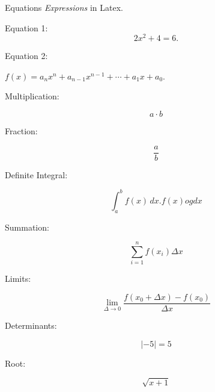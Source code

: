 \documentclass[a4paper,12pt,oneside,article]{memoir}
\begin{document}
\begin{flushleft}
Equations \emph{Expressions} in Latex.

Equation 1:
\begin{equation}
	2x^2+4=6.\label{eq:ligning}
\end{equation}

Equation 2: 
\begin{flushright}
    $f(x) = a_{n} x^{n} + a_{n-1}x^{n-1}+\cdots +a_{1}x + a_{0}$.
\end{flushright}


Multiplication:

\begin{equation*}
	a\cdot b
\end{equation*}

\vspace{.005cm}

Fraction:


\begin{equation*}
	\frac{a}{b}
\end{equation*}

\vspace{.1cm}

Definite Integral:

\begin{equation*}
	\int_a^b f(x)\, dx. 
    f(x) og dx
\end{equation*}


\vspace{.1cm}

Summation:

\begin{equation*}
	\sum_{i=1}^n f(x_i) \Delta x
\end{equation*}


\vspace{.1cm}

Limits:

\begin{equation*}
	\lim_{\Delta \to 0} \frac{f(x_0+\Delta x)-f(x_0)}{\Delta x}
\end{equation*}

\vspace{.1cm}

Determinants:

\begin{equation*}
	\lvert -5 \rvert=5
\end{equation*}

\vspace{.1cm}

Root:

\begin{equation*}
	\sqrt{x+1}
\end{equation*}


\end{flushleft}
\end{document}
